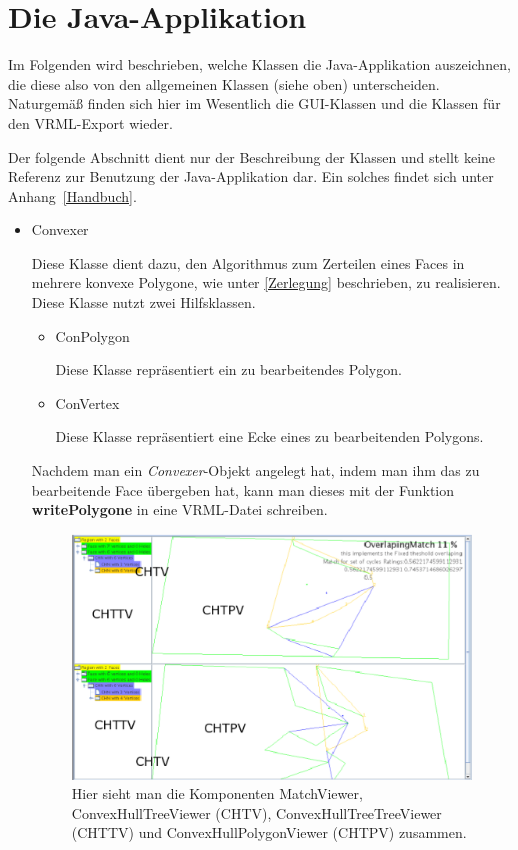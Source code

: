 \section{Die Java-Applikation}\label{java}
Im Folgenden  wird beschrieben, welche Klassen die Java-Applikation auszeichnen, die diese also von den allgemeinen Klassen (siehe oben) unterscheiden. Naturgemäß finden sich hier im Wesentlich die GUI-Klassen und die Klassen für den VRML-Export wieder.

Der folgende Abschnitt dient nur der Beschreibung der Klassen und stellt keine Referenz zur Benutzung der Java-Applikation dar. Ein solches findet sich unter Anhang~\vref{Handbuch}.

\begin{itemize}
\item Convexer

Diese Klasse dient dazu, den Algorithmus zum Zerteilen eines Faces in mehrere konvexe Polygone, wie unter \vref{Zerlegung} beschrieben, zu realisieren. Diese Klasse nutzt zwei Hilfsklassen.
\begin{itemize}

\item ConPolygon

Diese Klasse repräsentiert ein zu bearbeitendes Polygon.
\item ConVertex

Diese Klasse repräsentiert eine Ecke eines zu bearbeitenden Polygons.
\end{itemize}

Nachdem man ein \textit{Convexer}-Objekt angelegt hat, indem man ihm das zu bearbeitende Face übergeben hat, kann man dieses mit der Funktion \textbf{writePolygone} in eine VRML-Datei schreiben.

\begin{figure}
	\centering
	\includegraphics[scale=0.8]{MatchViewer.eps}
	\caption[Ein MatchViewer mit allen Unteklassen] {Hier sieht man die Komponenten MatchViewer, ConvexHullTreeViewer (CHTV), ConvexHullTreeTreeViewer (CHTTV) und ConvexHullPolygonViewer (CHTPV) zusammen.}
	\label{fig:MatchViewer}
\end{figure}


\end{itemize}
